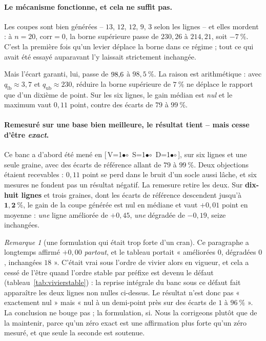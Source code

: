 \documentclass[11pt,a4paper]{article}
\theoremstyle{plain}
\theoremstyle{remark}
\newtheorem{remark}{Remarque}
\newcommand{\cfgm}[1]{\ifnum#1=1$\bullet$\else$\circ$\fi}
\newcommand{\conf}[3]{%
  \textsf{\footnotesize[\,V\cfgm{#1}\ S\cfgm{#2}\ D\cfgm{#3}\,]}}
\begin{document}
\paragraph{Le mécanisme fonctionne, et cela ne suffit pas.} Les coupes sont
bien générées -- $13$, $12$, $12$, $9$, $3$ selon les lignes -- et elles
mordent : à $n=20$, $\text{corr}=0$, la borne supérieure passe de $230{,}26$
à $214{,}21$, soit $-7\ \%$. C'est la première fois qu'un levier déplace la
borne dans ce régime ; tout ce qui avait été essayé auparavant l'y laissait
strictement inchangée.

Mais l'écart garanti, lui, passe de $98{,}6{}$ à $98{,}5\ \%$. La raison est
arithmétique : avec $q_{\text{lb}}\approx 3{,}7$ et $q_{\text{ub}}\approx
230$, réduire la borne supérieure de $7\ \%$ ne déplace le rapport que d'un
dixième de point. Sur les six lignes, le gain médian est \emph{nul} et le
maximum vaut $0{,}11$ point, contre des écarts de $79$ à $99\ \%$.

\paragraph{Remesuré sur une base bien meilleure, le résultat tient --
mais cesse d'être \emph{exact}.} Ce banc a d'abord été mené en
\conf{0}{0}{0}, sur six lignes et une seule graine, avec des écarts de
référence allant de $79$ à $99\ \%$. Deux objections étaient recevables :
$0{,}11$ point se perd dans le bruit d'un socle aussi lâche, et six mesures
ne fondent pas un résultat négatif. La remesure retire les deux. Sur
\textbf{dix-huit lignes} et trois graines, dont les écarts de référence
descendent jusqu'à $\mathbf{1{,}2\ \%}$, le gain de la coupe générée est nul
en médiane et vaut $+0{,}01$ point en moyenne : \emph{une} ligne améliorée
de $+0{,}45$, \emph{une} dégradée de $-0{,}19$, seize inchangées.

\begin{remark}[une formulation qui était trop forte d'un cran]
\label{rem:cglpexact}
Ce paragraphe a longtemps affirmé $+0{,}00$ \emph{partout}, et le tableau
portait « améliorées $0$, dégradées $0$, inchangées $18$ ». C'était vrai
sous l'ordre de vivier alors en vigueur, et cela a cessé de l'être quand
l'ordre stable par préfixe est devenu le défaut
(tableau~\ref{tab:vivierstable}) : la reprise intégrale du banc sous ce
défaut fait apparaître les deux lignes non nulles ci-dessus. Le résultat
n'est donc pas « exactement nul » mais « nul à un demi-point près sur des
écarts de $1$ à $96\ \%$ ». La conclusion ne bouge pas ; la formulation,
si. Nous la corrigeons plutôt que de la maintenir, parce qu'un zéro exact
est une affirmation plus forte qu'un zéro mesuré, et que seule la seconde
est soutenue.
\end{remark}
\end{document}
